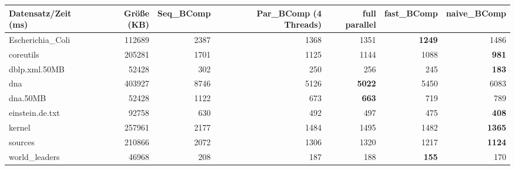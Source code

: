 \documentclass[10pt,a4paper]{standalone}
\begin{document}
	
	
	\begin{tabular}{l|r|r|r|r|r|r}
		Datensatz/Zeit (ms) & Größe (KB) & Seq\_BComp & Par\_BComp (4 Threads) & full parallel & fast\_BComp & naive\_BComp \\ \hline
  Escherichia\_Coli & 112689 & 2387 & 1368 &          1351 & \textbf{1249} &          1486 \\
          coreutils & 205281 & 1701 & 1125 &          1144 &          1088 &  \textbf{981} \\
      dblp.xml.50MB &  52428 &  302 &  250 &           256 &           245 &  \textbf{183} \\
                dna & 403927 & 8746 & 5126 & \textbf{5022} &          5450 &          6083 \\
           dna.50MB &  52428 & 1122 &  673 &  \textbf{663} &           719 &           789 \\
    einstein.de.txt &  92758 &  630 &  492 &           497 &           475 &  \textbf{408} \\
             kernel & 257961 & 2177 & 1484 &          1495 &          1482 & \textbf{1365} \\
            sources & 210866 & 2072 & 1306 &          1320 &          1217 & \textbf{1124} \\
     world\_leaders &  46968 &  208 &  187 &           188 &  \textbf{155} &           170 \\
	\end{tabular}
\end{document}
